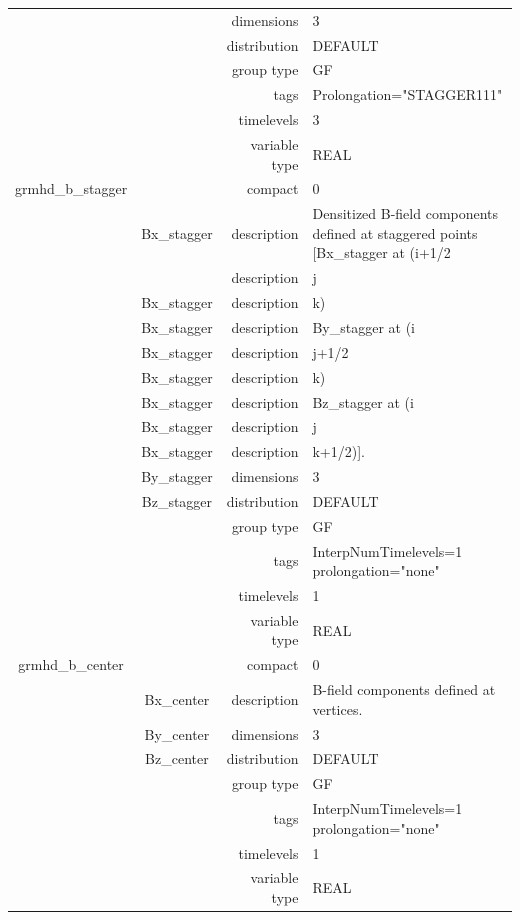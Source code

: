 \begin{tabular*}{150mm}{|c|c@{\extracolsep{\fill}}|rl|}
 &  & dimensions & 3 \\ 
 &  & distribution & DEFAULT \\ 
 &  & group type & GF \\ 
 &  & tags & Prolongation="STAGGER111" \\ 
 &  & timelevels & 3 \\ 
 &  & variable type & REAL \\ 
\hline 
grmhd\_b\_stagger &  & compact & 0 \\ 
 & Bx\_stagger & description & Densitized B-field components defined at staggered points [Bx\_stagger at (i+1/2 \\ 
& ~ & description & j \\ 
 & Bx\_stagger & description & k) \\ 
 & Bx\_stagger & description & By\_stagger at (i \\ 
 & Bx\_stagger & description & j+1/2 \\ 
 & Bx\_stagger & description & k) \\ 
 & Bx\_stagger & description & Bz\_stagger at (i \\ 
 & Bx\_stagger & description & j \\ 
 & Bx\_stagger & description & k+1/2)]. \\ 
 & By\_stagger & dimensions & 3 \\ 
 & Bz\_stagger & distribution & DEFAULT \\ 
 &  & group type & GF \\ 
 &  & tags & InterpNumTimelevels=1 prolongation="none" \\ 
 &  & timelevels & 1 \\ 
 &  & variable type & REAL \\ 
\hline 
grmhd\_b\_center &  & compact & 0 \\ 
 & Bx\_center & description & B-field components defined at vertices. \\ 
 & By\_center & dimensions & 3 \\ 
 & Bz\_center & distribution & DEFAULT \\ 
 &  & group type & GF \\ 
 &  & tags & InterpNumTimelevels=1 prolongation="none" \\ 
 &  & timelevels & 1 \\ 
 &  & variable type & REAL \\ 
\hline 
\end{tabular*} 



\vspace{5mm}
\vspace{5mm}

